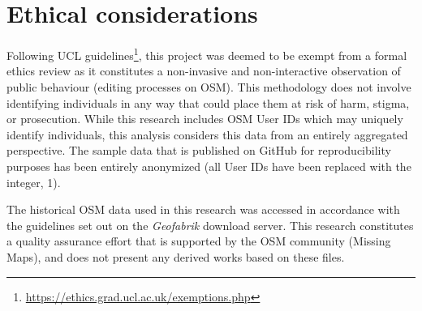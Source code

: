\section{Ethical considerations}

Following UCL guidelines\footnote{\url{https://ethics.grad.ucl.ac.uk/exemptions.php}}, this project was deemed to be exempt from a formal ethics review as it constitutes a non-invasive and non-interactive observation of public behaviour (editing processes on OSM). This methodology does not involve identifying individuals in any way that could place them at risk of harm, stigma, or prosecution. While this research includes OSM User IDs which may uniquely identify individuals, this analysis considers this data from an entirely aggregated perspective. The sample data that is published on GitHub for reproducibility purposes has been entirely anonymized (all User IDs have been replaced with the integer, 1). 

The historical OSM data used in this research was accessed in accordance with the guidelines set out on the \textit{Geofabrik} download server. This research constitutes a quality assurance effort that is supported by the OSM community (Missing Maps), and does not present any derived works based on these files. 


